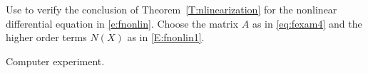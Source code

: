 \documentclass{ximera}
\begin{document}
\begin{computerExercise} \label{c11.4.7}
Use \Matlab to verify the conclusion of Theorem~\ref{T:nlinearization}
for the nonlinear differential equation in \eqref{e:fnonlin}.  Choose
the matrix $A$ as in \eqref{eq:fexam4} and the higher order terms $N(X)$
as in \eqref{E:fnonlin1}.

\begin{solution}
Computer experiment.




\end{solution}
\end{computerExercise}
\end{document}
